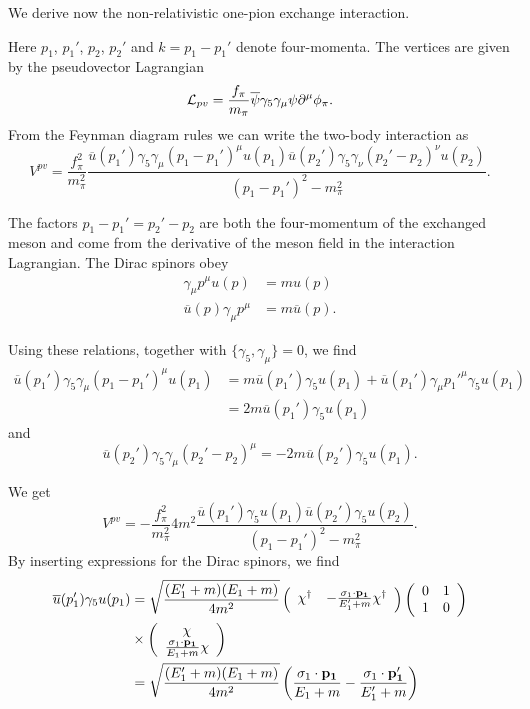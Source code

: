\documentclass[%
oneside,                 %
final,                   %
10pt]{article}
\begin{document}
We derive now the non-relativistic one-pion exchange interaction.

Here $p_{1}$, $p_{1}'$, $p_{2}$, $p_{2}'$ and $k=p_{1}-p_{1}'$ denote 
four-momenta.  
The vertices are 
given by the pseudovector Lagrangian
\[
{\cal L}_{pv}=\frac{f_{\pi}}{m_{\pi}}\overline{\psi}\gamma_{5}\gamma_{\mu}
\psi\partial^{\mu}\phi_{\pi}.
\]
 From the Feynman diagram rules we can write the two-body interaction as  
\[
V^{pv}=\frac{f_{\pi}^{2}}{m_{\pi}^{2}}\frac{\overline{u}(p_{1}')\gamma_{5}
\gamma_{\mu}(p_{1}-p_{1}')^{\mu}u(p_{1})\overline{u}(p_{2}')\gamma_{5}
\gamma_{\nu}(p_{2}'-p_{2})^{\nu}u(p_{2})}{(p_{1}-p_{1}')^{2}-m_{\pi}^{2}}.
\]

The factors $p_{1}-p_{1}'=p_{2}'-p_{2}$ are both the four-momentum of the 
exchanged meson and come from the derivative of the meson field in 
the interaction Lagrangian. 
The Dirac spinors obey 
\begin{align*}
\gamma_{\mu}p^{\mu}u(p)&=mu(p) \nonumber \\
\overline{u}(p)\gamma_{\mu}p^{\mu}&=m\overline{u}(p). \nonumber
\end{align*} 

Using these relations, together with $\{\gamma_{5},\gamma_{\mu}\}=0$, we find 
\begin{align*}
\overline{u}(p_{1}')\gamma_{5}\gamma_{\mu}(p_{1}-p_{1}')^{\mu}u(p_{1})
&=m\overline{u}(p_{1}')\gamma_{5}u(p_{1})+\overline{u}(p_{1}')\gamma_{\mu}
p_{1}'^{\mu}\gamma_{5}u(p_{1}) \nonumber \\
& =2m\overline{u}(p_{1}')\gamma_{5}u(p_{1}) \nonumber
\end{align*}
and 
\[
\overline{u}(p_{2}')\gamma_{5}\gamma_{\mu}(p_{2}'-p_{2})^{\mu}=
-2m\overline{u}(p_{2}')\gamma_{5}u(p_{1}).
\]

We get
\[
V^{pv}=-\frac{f_{\pi}^{2}}{m_{\pi}^{2}}4m^{2}\frac{\overline{u}(p_{1}')
\gamma_{5}u(p_{1})\overline{u}(p_{2}')\gamma_{5}u(p_{2})}{(p_{1}-p_{1}')
^{2}-m_{\pi}^{2}}.
\]
By inserting expressions for the Dirac spinors, we find
\begin{align*}
\overline{u}(p_{1}')\gamma_{5}u(p_{1})&=\sqrt{\frac{(E_{1}'+m)(E_{1}+m)}
{4m^{2}}}\left(\begin{array}{cc}\chi^{\dagger}&-\frac{\sigma_{1}\cdot{
\bf p_{1}}}{E_{1}'
+m}\chi^{\dagger}\end{array}\right)\left(\begin{array}{cc}0&1\\1&0\end{array}
\right)\nonumber \\
 &\times \left(\begin{array}{c}\chi\\ \frac{\sigma_{1}\cdot\mathbf{p_{1}}}{E_{1}+m}\chi
\end{array}\right) 
\nonumber \\
 &=\sqrt{\frac{(E_{1}'+m)(E_{1}+m)}{4m^{2}}}\left(\frac{\sigma_{1}\cdot
\mathbf{p_{1}}}{E_{1}+m}-\frac{\sigma_{1}\cdot\mathbf{p_{1}'}}{E_{1}'+m}\right) 
\nonumber 
\end{align*}
\end{document}
